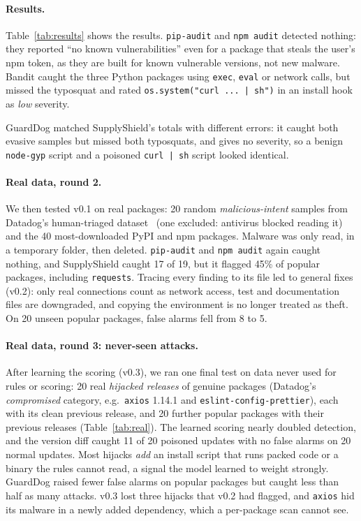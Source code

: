 \documentclass[runningheads]{llncs}
\begin{document}
\paragraph{Results.} Table~\ref{tab:results} shows the results. \texttt{pip-audit} and \texttt{npm audit} detected nothing: they reported ``no known vulnerabilities'' even for a package that steals the user's npm token, as they are built for known vulnerable versions, not new malware. Bandit caught the three Python packages using \texttt{exec}, \texttt{eval} or network calls, but missed the typosquat and rated \texttt{os.system("curl ... | sh")} in an install hook as \emph{low} severity.

GuardDog matched SupplyShield's totals with different errors: it caught both evasive samples but missed both typosquats, and gives no severity, so a benign \texttt{node-gyp} script and a poisoned \texttt{curl | sh} script looked identical.

\paragraph{Real data, round 2.} We then tested v0.1 on real packages: 20 random \emph{malicious-intent} samples from Datadog's human-triaged dataset~\cite{datadog_dataset} (one excluded: antivirus blocked reading it) and the 40 most-downloaded PyPI and npm packages. Malware was only read, in a temporary folder, then deleted. \texttt{pip-audit} and \texttt{npm audit} again caught nothing, and SupplyShield caught 17 of 19, but it flagged 45\% of popular packages, including \texttt{requests}. Tracing every finding to its file led to general fixes (v0.2): only real connections count as network access, test and documentation files are downgraded, and copying the environment is no longer treated as theft. On 20 unseen popular packages, false alarms fell from 8 to 5.

\paragraph{Real data, round 3: never-seen attacks.} After learning the scoring (v0.3), we ran one final test on data never used for rules or scoring: 20 real \emph{hijacked releases} of genuine packages (Datadog's \emph{compromised} category, e.g.\ \texttt{axios} 1.14.1 and \texttt{eslint-config-prettier}), each with its clean previous release, and 20 further popular packages with their previous releases (Table~\ref{tab:real}). The learned scoring nearly doubled detection, and the version diff caught 11 of 20 poisoned updates with no false alarms on 20 normal updates. Most hijacks \emph{add} an install script that runs packed code or a binary the rules cannot read, a signal the model learned to weight strongly. GuardDog raised fewer false alarms on popular packages but caught less than half as many attacks. v0.3 lost three hijacks that v0.2 had flagged, and \texttt{axios} hid its malware in a newly added dependency, which a per-package scan cannot see.
\end{document}
